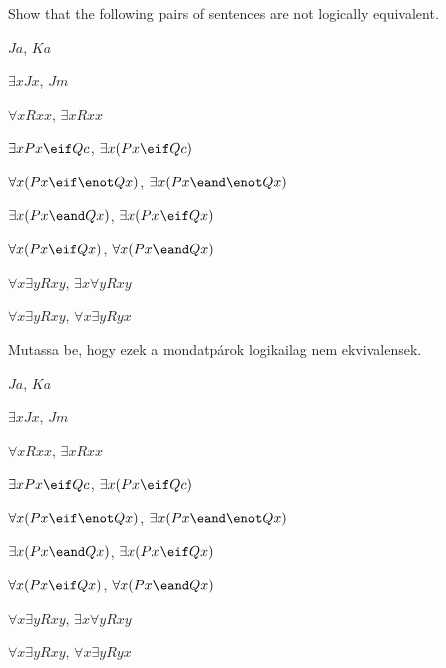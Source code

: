 \solutions
\problempart
\label{pr.NotEquiv}
Show that the following pairs of sentences are not logically equivalent.
\begin{earg}
\item $Ja$, $Ka$
\item $\exists x Jx$, $Jm$
\item $\forall x Rxx$, $\exists x Rxx$
\item $\exists x Px \eif Qc$, $\exists x (Px \eif Qc)$
\item $\forall x(Px \eif \enot Qx)$, $\exists x(Px \eand \enot Qx)$
\item $\exists x(Px \eand Qx)$, $\exists x(Px \eif Qx)$
\item $\forall x(Px\eif Qx)$, $\forall x(Px \eand Qx)$
\item $\forall x\exists y Rxy$, $\exists x\forall y Rxy$
\item $\forall x\exists y Rxy$, $\forall x\exists y Ryx$
\end{earg}
\solutions
\problempart
\label{pr.NotEquiv}
Mutassa be, hogy ezek a mondatpárok logikailag nem ekvivalensek.
\begin{earg}
\item $Ja$, $Ka$
\item $\exists x Jx$, $Jm$
\item $\forall x Rxx$, $\exists x Rxx$
\item $\exists x Px \eif Qc$, $\exists x (Px \eif Qc)$
\item $\forall x(Px \eif \enot Qx)$, $\exists x(Px \eand \enot Qx)$
\item $\exists x(Px \eand Qx)$, $\exists x(Px \eif Qx)$
\item $\forall x(Px\eif Qx)$, $\forall x(Px \eand Qx)$
\item $\forall x\exists y Rxy$, $\exists x\forall y Rxy$
\item $\forall x\exists y Rxy$, $\forall x\exists y Ryx$
\end{earg}


